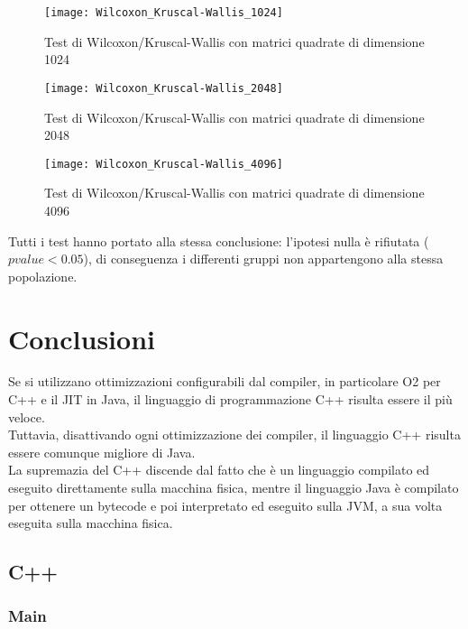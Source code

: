 \begin{figure}[!htbp]
  \centering
  \texttt{[image: Wilcoxon\_Kruscal-Wallis\_1024]}
  \caption{Test di Wilcoxon/Kruscal-Wallis con matrici quadrate di dimensione 1024}
  \label{Wilcoxon_Kruscal-Wallis_1024}
\end{figure}

\clearpage

\begin{figure}[!htbp]
  \texttt{[image: Wilcoxon\_Kruscal-Wallis\_2048]}
  \caption{Test di Wilcoxon/Kruscal-Wallis con matrici quadrate di dimensione 2048}
  \label{Wilcoxon_Kruscal-Wallis_2048}
\end{figure}

\clearpage

\begin{figure}[!htbp]
  \texttt{[image: Wilcoxon\_Kruscal-Wallis\_4096]}
  \caption{Test di Wilcoxon/Kruscal-Wallis con matrici quadrate di dimensione 4096}
  \label{Wilcoxon_Kruscal-Wallis_4096}
\end{figure}

Tutti i test hanno portato alla stessa conclusione: l'ipotesi nulla è
rifiutata ($pvalue < 0.05$), di conseguenza i differenti gruppi non appartengono
alla stessa popolazione.\\

\clearpage

\section{Conclusioni}
Se si utilizzano ottimizzazioni configurabili dal compiler, in particolare O2
per C++ e il JIT in Java, il linguaggio di programmazione C++ risulta essere il
più veloce.\\
Tuttavia, disattivando ogni ottimizzazione dei compiler, il linguaggio C++
risulta essere comunque migliore di Java.\\
La supremazia del C++ discende dal fatto che è un linguaggio compilato ed
eseguito direttamente sulla macchina fisica, mentre il linguaggio Java è compilato
per ottenere un bytecode e poi interpretato ed eseguito sulla JVM, a sua volta
eseguita sulla macchina fisica.

\subsection{C++}
\subsubsection{Main}


